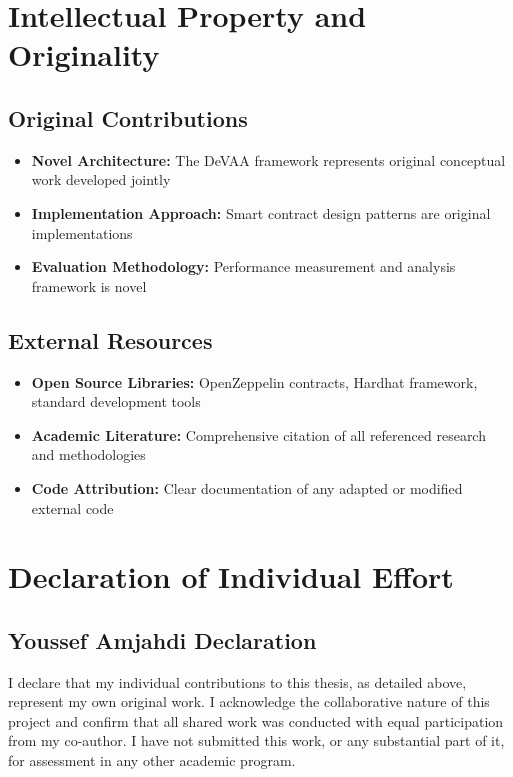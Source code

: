 \section{Intellectual Property and Originality}

\subsection{Original Contributions}
\begin{itemize}
\item \textbf{Novel Architecture:} The DeVAA framework represents original conceptual work developed jointly
\item \textbf{Implementation Approach:} Smart contract design patterns are original implementations
\item \textbf{Evaluation Methodology:} Performance measurement and analysis framework is novel
\end{itemize}

\subsection{External Resources}
\begin{itemize}
\item \textbf{Open Source Libraries:} OpenZeppelin contracts, Hardhat framework, standard development tools
\item \textbf{Academic Literature:} Comprehensive citation of all referenced research and methodologies
\item \textbf{Code Attribution:} Clear documentation of any adapted or modified external code
\end{itemize}

\section{Declaration of Individual Effort}

\subsection{Youssef Amjahdi Declaration}
I declare that my individual contributions to this thesis, as detailed above, represent my own original work. I acknowledge the collaborative nature of this project and confirm that all shared work was conducted with equal participation from my co-author. I have not submitted this work, or any substantial part of it, for assessment in any other academic program.

